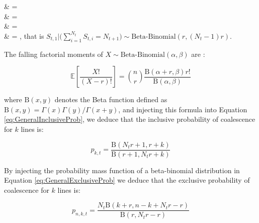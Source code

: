 \documentclass{article}
\let\oldalign\align
\let\oldendalign\endalign
\renewenvironment{align}{\linenomathNonumbers\oldalign}{\oldendalign\endlinenomath}
\begin{document}
{\allowdisplaybreaks
	\begin{align}
		\bigg[ S_{t,1} = s \bigg| \sum_{i=1}^{N_t} S_{t,i} = N_{t+1} \bigg]
			& =  \nonumber\\
			& =  \nonumber\\
			& =    \nonumber\\
			& =  ,
	\end{align}
}
that is $S_{t,1} \bigg| \bigg(\sum_{i=1}^{N_t} S_{t,i} = N_{t+1} \bigg) \sim \text{Beta-Binomial}(r, (N_t - 1)r)$.

The falling factorial moments of $X \sim \text{Beta-Binomial}(\alpha,\beta)$ are \citep{Tripathi1994}:

\begin{equation}
	\mathbb{E}\left[\frac{X!}{(X-r)!}\right]=\binom{n}{r} \frac{\mathrm{B}(\alpha+r,\beta)r!}{\mathrm{B}(\alpha,\beta)}
\end{equation}

\noindent where  $\mathrm{B}(x,y)$ denotes the Beta function defined as $\mathrm{B}(x,y)=\Gamma(x)\Gamma(y)/\Gamma(x+y)$, and injecting this formula into Equation \eqref{eq:GeneralInclusiveProb}, we deduce that the inclusive probability of coalescence for $k$ lines is:

\begin{equation}
p_{k,t}=
\frac{\mathrm{B}(N_t r+1,r+k)}{\mathrm{B}(r+1,N_t r+k)}
\label{eq:NegBinInclusiveProb}
\end{equation}

By injecting the probability mass function of a beta-binomial distribution in Equation 
\eqref{eq:GeneralExclusiveProb} we deduce that 
the exclusive probability of coalescence for $k$ lines is:

\begin{equation}
p_{n,k,t}=\frac{N_t \mathrm{B}(k+r, n-k+N_t r-r)}{\mathrm{B}(r, N_t r-r)}
\label{eq:NegBinExclusiveProb}
\end{equation}
\end{document}
